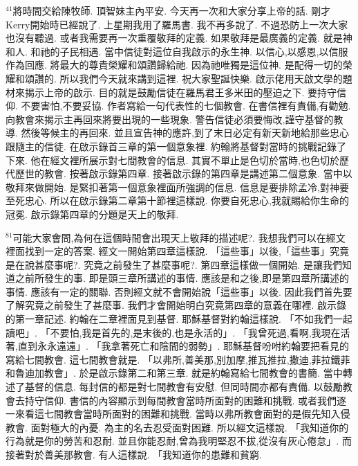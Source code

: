 \documentclass{book}
\begin{document}
$^{41}$將時間交給陳牧師.
頂智妹主內平安.
今天再一次和大家分享上帝的話.
剛才Kerry開始時已經說了.
上星期我用了羅馬書.
我不再多說了.
不過恐防上一次大家也沒有聽過.
或者我需要再一次重覆敬拜的定義.
如果敬拜是最廣義的定義.
就是神和人.
和祂的子民相遇.
當中信徒對這位自我啟示的永生神.
以信心,以感恩,以信服作為回應.
將最大的尊貴榮耀和頌讚歸給祂.
因為祂唯獨是這位神.
是配得一切的榮耀和頌讚的.
所以我們今天就來講到這裡.
祝大家聖誕快樂.
啟示佬用天啟文學的題材來揭示上帝的啟示.
目的就是鼓勵信徒在羅馬君王多米田的壓迫之下.
要持守信仰.
不要害怕,不要妥協.
作者寫給一句代表性的七個教會.
在書信裡有責備,有勸勉.
向教會來揭示主再回來將要出現的一些現象.
警告信徒必須要悔改,謹守基督的教導.
然後等候主的再回來.
並且宣告神的應許,到了末日必定有新天新地給那些忠心跟隨主的信徒.
在啟示錄首三章的第一個意象裡.
約翰將基督對當時的挑戰記錄了下來.
他在經文裡所展示對七間教會的信息.
其實不單止是色切於當時,也色切於歷代歷世的教會.
按著啟示錄第四章.
接著啟示錄的第四章是講述第二個意象.
當中以敬拜來做開始.
是緊扣著第一個意象裡面所強調的信息.
信息是要排除孟冷,對神要至死忠心.
所以在啟示錄第二章第十節裡這樣說.
你要自死忠心,我就賜給你生命的冠冕.
啟示錄第四章的分題是天上的敬拜.

$^{81}$可能大家會問,為何在這個時間會出現天上敬拜的描述呢?.
我想我們可以在經文裡面找到一定的答案.
經文一開始第四章這樣說.
「這些事」以後,「這些事」究竟是在說甚麼事呢?.
究竟之前發生了甚麼事呢?.
第四章這樣做一個開始.
是讓我們知道之前所發生的事.
即是頭三章所講述的事情.
應該是和之後,即是第四章所講述的事情.
應該有一定的關聯.
否則經文就不會開始說「這些事」以後.
因此我們首先要了解究竟之前發生了甚麼事.
我們才會開始明白究竟第四章的意義在哪裡.
啟示錄的第一章記述.
約翰在二章裡面見到基督.
耶穌基督對約翰這樣說.
「不如我們一起讀吧」.
「不要怕,我是首先的,是末後的,也是永活的」.
「我曾死過,看啊,我現在活著,直到永永遠遠」.
「我拿著死亡和陰間的弱勢」.
耶穌基督吩咐約翰要把看見的寫給七間教會.
這七間教會就是.
「以弗所,善美那,別加摩,推瓦推拉,撒迪,菲拉鐵菲和魯迪加教會」.
於是啟示錄第二和第三章.
就是約翰寫給七間教會的書簡.
當中轉述了基督的信息.
每封信的都是對七間教會有安慰.
但同時間亦都有責備.
以鼓勵教會去持守信仰.
書信的內容顯示到每間教會當時所面對的困難和挑戰.
或者我們逐一來看這七間教會當時所面對的困難和挑戰.
當時以弗所教會面對的是假先知入侵教會.
面對極大的內憂.
為主的名去忍受面對困難.
所以經文這樣說.
「我知道你的行為就是你的勞苦和忍耐.
並且你能忍耐,曾為我明堅忍不拔,從沒有灰心倦怠」.
而接著對於善美那教會.
有人這樣說.
「我知道你的患難和貧窮.
\end{document}
